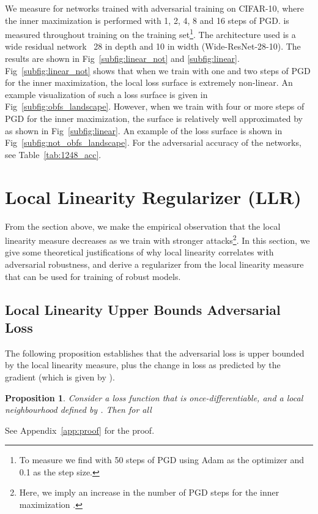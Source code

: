 \documentclass{article}
\theoremstyle{plain}
\newtheorem{prop}[thm]{Proposition}
\theoremstyle{definition}
\theoremstyle{remark}
\begin{document}
We measure  for networks trained with adversarial training on CIFAR-10, where the inner maximization  is performed with 1, 2, 4, 8 and 16 steps of PGD.  is measured throughout training on the training set\footnote{To measure  we find  with 50 steps of PGD using Adam as the optimizer and 0.1 as the step size.}. The architecture used is a wide residual network~\citep{zagoruyko2016wide} 28 in depth and 10 in width  (Wide-ResNet-28-10).  The results are shown in Fig~\ref{subfig:linear_not} and \ref{subfig:linear}. Fig~\ref{subfig:linear_not} shows that when we train with one and two steps of PGD for the inner maximization, the local loss surface is extremely non-linear. An example visualization of such a loss surface is given in Fig~\ref{subfig:obfs_landscape}. However, when we train with four or more steps of PGD for the inner maximization, the surface is relatively well approximated by  as shown in Fig~\ref{subfig:linear}. An example of the loss surface is shown in Fig~\ref{subfig:not_obfs_landscape}. For the adversarial accuracy of the networks, see Table~\ref{tab:1248_acc}.
 \section{Local Linearity Regularizer (LLR)}
From the section above, we make the empirical observation that the local linearity measure  decreases as we train with stronger attacks\footnote{Here, we imply an increase in the number of PGD steps for the inner maximization .}. In this section, we give some theoretical justifications of why local linearity  correlates with adversarial robustness, and derive a regularizer from the local linearity measure that can be used for training of robust models.

\subsection{Local Linearity Upper Bounds Adversarial Loss}\label{sec:upper_bound}


The following proposition establishes that the adversarial loss  is upper bounded by the local linearity measure, plus the change in loss as predicted by the gradient (which is given by ).

\begin{prop}\label{Thm1}
 Consider a loss function  that is once-differentiable, and a local neighbourhood defined by . Then for all  

\end{prop}
See Appendix~\ref{app:proof} for the proof.
\end{document}
